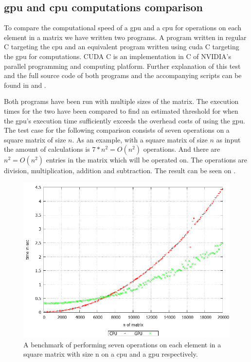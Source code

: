 \subsection{\acrshort{gpu} and \acrshort{cpu} computations comparison}\label{sub:gpubenchmark}
To compare the computational speed of a \acrshort{gpu} and a \acrshort{cpu} for operations on each element in a matrix we have written two programs.
A program written in regular C targeting the \acrshort{cpu} and an equivalent program written using \gls{cuda} C targeting the \acrshort{gpu} for computations.
CUDA C is an implementation in C of NVIDIA's parallel programming and computing platform.
Further explanation of this test and the full source code of both programs and the accompanying scripts can be found in  and .

Both programs have been run with multiple sizes of the matrix.
The execution times for the two have been compared to find an estimated threshold for when the \acrshort{gpu}'s execution time sufficiently exceeds the overhead costs of using the \acrshort{gpu}.
The test case for the following comparison consists of seven operations on a square matrix of size $n$.
As an example, with a square matrix of size $n$ as input the amount of calculations is $7*n^2 = O(n^2)$ operations. 
And there are $n^2 = O(n^2)$ entries in the matrix which will be operated on.
The operations are division, multiplication, addition and subtraction.
The result can be seen on .
\begin{figure}[h!]
\centering
 \includegraphics[width=1\textwidth]{figures/benchmark.png} %
\caption{A benchmark of performing seven operations on each element in a square matrix with size n on a \acrshort{cpu} and a \acrshort{gpu} respectively.}\label{image:benchmark}
\vspace{-15pt}
\end{figure}

